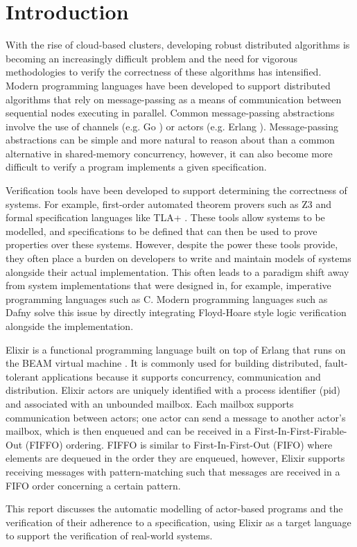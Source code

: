 \chapter{Introduction}
With the rise of cloud-based clusters, developing robust distributed algorithms is becoming an increasingly difficult problem and the need for vigorous methodologies to verify the correctness of these algorithms has intensified. Modern programming languages have been developed to support distributed algorithms that rely on message-passing as a means of communication between sequential nodes executing in parallel. Common message-passing abstractions involve the use of channels (e.g. Go \cite{go}) or actors \cite{actor} (e.g. Erlang \cite{erlang}). Message-passing abstractions can be simple and more natural to reason about than a common alternative in shared-memory concurrency, however, it can also become more difficult to verify a program implements a given specification.
\par
Verification tools have been developed to support determining the correctness of systems. For example, first-order automated theorem provers such as Z3 \cite{z3} and formal specification languages like TLA+ \cite{tlaplus}. These tools allow systems to be modelled, and specifications to be defined that can then be used to prove properties over these systems. However, despite the power these tools provide, they often place a burden on developers to write and maintain models of systems alongside their actual implementation. This often leads to a paradigm shift away from system implementations that were designed in, for example, imperative programming languages such as C. Modern programming languages such as Dafny \cite{dafny} solve this issue by directly integrating Floyd-Hoare style logic verification alongside the implementation.
\par
Elixir \cite{elixir} is a functional programming language built on top of Erlang that runs on the BEAM virtual machine \cite{beam}. It is commonly used for building distributed, fault-tolerant applications because it supports concurrency, communication and distribution. Elixir actors are uniquely identified with a process identifier (pid) and associated with an unbounded mailbox. Each mailbox supports communication between actors; one actor can send a message to another actor's mailbox, which is then enqueued and can be received in a First-In-First-Firable-Out (FIFFO) ordering. FIFFO is similar to First-In-First-Out (FIFO) where elements are dequeued in the order they are enqueued, however, Elixir supports receiving messages with pattern-matching such that messages are received in a FIFO order concerning a certain pattern.
\par
This report discusses the automatic modelling of actor-based programs and the verification of their adherence to a specification, using Elixir as a target language to support the verification of real-world systems.
